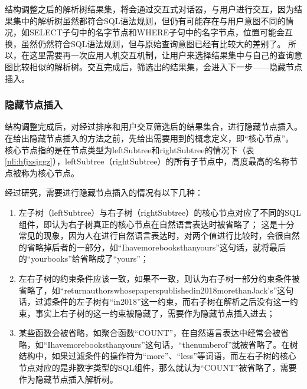 结构调整之后的解析树结果集，将会通过交互式对话器，与用户进行交互，因为结果集中的解析树虽然都符合SQL语法规则，但仍有可能存在与用户意图不同的情况，如SELECT子句中的名字节点和WHERE子句中的名字节点，位置可能会互换，虽然仍然符合SQL语法规则，但与原始查询意图已经有比较大的差别了。
所以，在这里需要再一次应用人机交互机制，让用户来选择结果集中与自己的查询意图比较相似的解析树。交互完成后，筛选出的结果集，会进入下一步——隐藏节点插入。

\subsubsection{隐藏节点插入}

结构调整完成后，对经过排序和用户交互筛选后的结果集合，进行隐藏节点插入。
在给出隐藏节点插入的方法之前，先给出需要用到的概念定义，即“核心节点”。
核心节点指的是在节点类型为leftSubtree和rightSubtree的情况下（表\ref{nli:hfjxsjggz}），leftSubtree（rightSubtree）的所有子节点中，高度最高的名称节点被称为核心节点。

经过研究，需要进行隐藏节点插入的情况有以下几种：
\begin{enumerate}
    \item 左子树（leftSubtree）与右子树（rightSubtree）的核心节点对应了不同的SQL组件，即认为右子树真正的核心节点在自然语言表达时被省略了\cite{zeng2014breaking}；
    这是十分常见的现象，因为人在进行自然语言表达时，对两个值进行比较时，会很自然的省略掉后者的一部分，如“Ihavemorebooksthanyours”这句话，就将最后的“yourbooks”给省略成了“yours”；
    \item 左右子树的约束条件应该一致，如果不一致，则认为右子树一部分约束条件被省略了，如“returnauthorswhosepaperspublishedin2018morethanJack’s”这句话，过滤条件的左子树有“in2018”这一约束，而右子树在解析之后没有这一约束，事实上右子树的这一约束被隐藏了，需要作为隐藏节点插入进去；
    \item 某些函数会被省略，如聚合函数“COUNT”，在自然语言表达中经常会被省略，如“Ihavemorebooksthanyours”这句话，“thenumberof”就被省略了。在树结构中，如果过滤条件的操作符为“more”、“less”等词语，而左右子树的核心节点对应的是非数字类型的SQL组件，那么就认为“COUNT”被省略了，需要作为隐藏节点插入解析树。
\end{enumerate}

